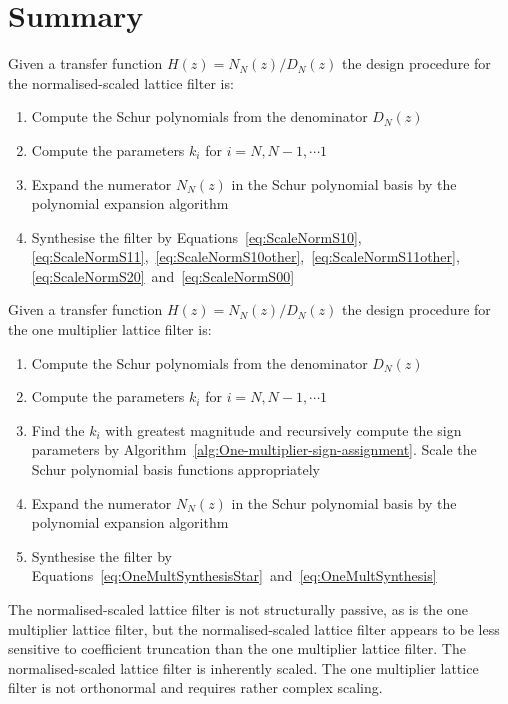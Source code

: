 \documentclass[a4paper,twoside,10pt,english]{report}
\begin{document}
\section{Summary}
Given a transfer function $H\left(z\right)=N_{N}\left(z\right)/D_{N}\left(z\right)$ the design procedure
for the normalised-scaled lattice filter is:
\begin{enumerate}
\item Compute the Schur polynomials from the denominator $D_{N}\left(z\right)$
\item Compute the parameters $k_{i}$ for $i=N,N-1,\cdots1$
\item Expand the numerator $N_{N}\left(z\right)$ in the Schur polynomial basis by
the polynomial expansion algorithm
\item Synthesise the filter by Equations~\ref{eq:ScaleNormS10}, 
\ref{eq:ScaleNormS11},~\ref{eq:ScaleNormS10other},~\ref{eq:ScaleNormS11other}, 
\ref{eq:ScaleNormS20}~and~\ref{eq:ScaleNormS00}
\end{enumerate}

Given a transfer function $H\left(z\right)=N_{N}\left(z\right)/D_{N}\left(z\right)$ the design procedure
for the one multiplier lattice filter is:
\begin{enumerate}
\item Compute the Schur polynomials from the denominator $D_{N}\left(z\right)$
\item Compute the parameters $k_{i}$ for $i=N,N-1,\cdots1$
\item Find the $k_{i}$ with greatest magnitude and recursively compute
the sign parameters by Algorithm~\ref{alg:One-multiplier-sign-assignment}.
Scale the Schur polynomial basis functions appropriately
\item Expand the numerator $N_{N}\left(z\right)$ in the Schur polynomial basis by
the polynomial expansion algorithm
\item Synthesise the filter by 
Equations~\ref{eq:OneMultSynthesisStar}~and~\ref{eq:OneMultSynthesis}
\end{enumerate}
The normalised-scaled lattice filter is not structurally passive, as is the
one multiplier lattice filter, but the normalised-scaled lattice filter
appears to be less sensitive to coefficient truncation than the 
one multiplier lattice filter. The normalised-scaled lattice filter is 
inherently scaled. The one multiplier lattice filter is not orthonormal and 
requires rather complex scaling.
\cleardoublepage{}
\end{document}
